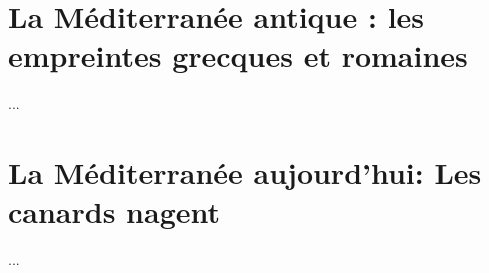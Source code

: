 \documentclass[xcolor=table,french,14pt]{beamer}
\begin{document}
\section{La Méditerranée antique : les empreintes grecques et romaines}

\begin{frame}
...
\end{frame}

\section{La Méditerranée aujourd'hui: Les canards nagent}

\begin{frame}
...
\end{frame}
\end{document}
